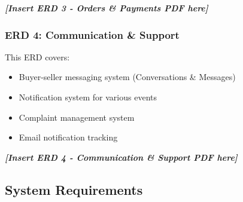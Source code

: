 \documentclass[12pt,a4paper]{article}
\begin{document}
\newpage
\begin{center}
\textit{\textbf{[Insert ERD 3 - Orders \& Payments PDF here]}}
\end{center}
\newpage

\subsubsection{ERD 4: Communication \& Support}
This ERD covers:
\begin{itemize}
    \item Buyer-seller messaging system (Conversations \& Messages)
    \item Notification system for various events
    \item Complaint management system
    \item Email notification tracking
\end{itemize}

\newpage
\begin{center}
\textit{\textbf{[Insert ERD 4 - Communication \& Support PDF here]}}
\end{center}
\newpage

\subsection{System Requirements}
\end{document}
